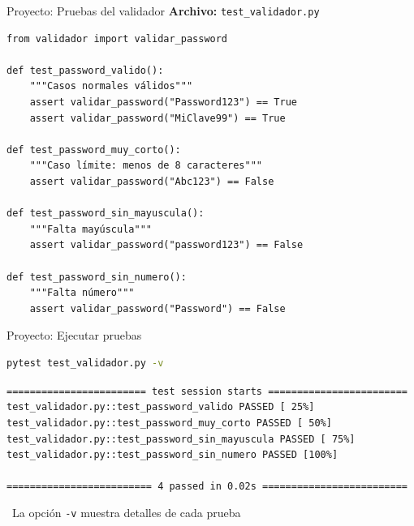 \documentclass{beamer}
\begin{document}
\begin{frame}[fragile]{Proyecto: Pruebas del validador \faVial}
\textbf{Archivo:} \texttt{test\_validador.py}
\begin{lstlisting}
from validador import validar_password

def test_password_valido():
    """Casos normales válidos"""
    assert validar_password("Password123") == True
    assert validar_password("MiClave99") == True

def test_password_muy_corto():
    """Caso límite: menos de 8 caracteres"""
    assert validar_password("Abc123") == False

def test_password_sin_mayuscula():
    """Falta mayúscula"""
    assert validar_password("password123") == False

def test_password_sin_numero():
    """Falta número"""
    assert validar_password("Password") == False
\end{lstlisting}
\end{frame}

\begin{frame}[fragile]{Proyecto: Ejecutar pruebas \faPlayCircle}
\begin{lstlisting}[language=bash, numbers=none]
pytest test_validador.py -v
\end{lstlisting}

\vspace{-0.2cm}
\begin{tcolorbox}[colback=green!10,colframe=green,title={\small\faArrowCircleRight \ Salida},coltitle=fg0,left=3pt,right=3pt,top=2pt,bottom=2pt,boxsep=1pt]
\small\texttt{======================== test session starts ========================\\
test\_validador.py::test\_password\_valido PASSED            [ 25\%]\\
test\_validador.py::test\_password\_muy\_corto PASSED        [ 50\%]\\
test\_validador.py::test\_password\_sin\_mayuscula PASSED   [ 75\%]\\
test\_validador.py::test\_password\_sin\_numero PASSED      [100\%]\\
\ \\
========================= 4 passed in 0.02s =========================}
\end{tcolorbox}

\vspace{-0.1cm}
\begin{notebox}
\small\faCheckCircle\ La opción \texttt{-v} muestra detalles de cada prueba
\end{notebox}
\end{frame}
\end{document}
